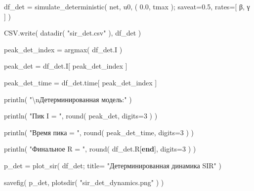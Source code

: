 \documentclass[
  english,
  russian,
  12pt,
  a4paper,
  DIV=11,
  numbers=noendperiod]{scrreprt}
\newenvironment{Shaded}{\begin{snugshade}}{\end{snugshade}}
\newcommand{\FloatTok}[1]{\textcolor[rgb]{0.68,0.00,0.00}{#1}}
\newcommand{\FunctionTok}[1]{\textcolor[rgb]{0.28,0.35,0.67}{#1}}
\newcommand{\KeywordTok}[1]{\textcolor[rgb]{0.00,0.23,0.31}{\textbf{#1}}}
\newcommand{\NormalTok}[1]{\textcolor[rgb]{0.00,0.23,0.31}{#1}}
\newcommand{\OperatorTok}[1]{\textcolor[rgb]{0.37,0.37,0.37}{#1}}
\newcommand{\SpecialCharTok}[1]{\textcolor[rgb]{0.37,0.37,0.37}{#1}}
\newcommand{\StringTok}[1]{\textcolor[rgb]{0.13,0.47,0.30}{#1}}
\begin{document}
\begin{Shaded}
\begin{Highlighting}[]
\NormalTok{df\_det }\OperatorTok{=}
    \FunctionTok{simulate\_deterministic}\NormalTok{(}
\NormalTok{        net,}
\NormalTok{        u0,}
\NormalTok{        (}
            \FloatTok{0.0}\NormalTok{,}
\NormalTok{            tmax}
\NormalTok{        );}
\NormalTok{        saveat}\OperatorTok{=}\FloatTok{0.5}\NormalTok{,}
\NormalTok{        rates}\OperatorTok{=}\NormalTok{[}
\NormalTok{            β,}
\NormalTok{            γ}
\NormalTok{        ]}
\NormalTok{    )}

\NormalTok{CSV.}\FunctionTok{write}\NormalTok{(}
    \FunctionTok{datadir}\NormalTok{(}
        \StringTok{"sir\_det.csv"}
\NormalTok{    ),}
\NormalTok{    df\_det}
\NormalTok{)}

\NormalTok{peak\_det\_index }\OperatorTok{=}
    \FunctionTok{argmax}\NormalTok{(}
\NormalTok{        df\_det.I}
\NormalTok{    )}

\NormalTok{peak\_det }\OperatorTok{=}
\NormalTok{    df\_det.I[}
\NormalTok{        peak\_det\_index}
\NormalTok{    ]}

\NormalTok{peak\_det\_time }\OperatorTok{=}
\NormalTok{    df\_det.time[}
\NormalTok{        peak\_det\_index}
\NormalTok{    ]}

\FunctionTok{println}\NormalTok{(}
    \StringTok{"}\SpecialCharTok{\textbackslash{}n}\StringTok{Детерминированная модель:"}
\NormalTok{)}

\FunctionTok{println}\NormalTok{(}
    \StringTok{"Пик I = "}\NormalTok{,}
    \FunctionTok{round}\NormalTok{(}
\NormalTok{        peak\_det,}
\NormalTok{        digits}\OperatorTok{=}\FloatTok{3}
\NormalTok{    )}
\NormalTok{)}

\FunctionTok{println}\NormalTok{(}
    \StringTok{"Время пика = "}\NormalTok{,}
    \FunctionTok{round}\NormalTok{(}
\NormalTok{        peak\_det\_time,}
\NormalTok{        digits}\OperatorTok{=}\FloatTok{3}
\NormalTok{    )}
\NormalTok{)}

\FunctionTok{println}\NormalTok{(}
    \StringTok{"Финальное R = "}\NormalTok{,}
    \FunctionTok{round}\NormalTok{(}
\NormalTok{        df\_det.R[}\KeywordTok{end}\NormalTok{],}
\NormalTok{        digits}\OperatorTok{=}\FloatTok{3}
\NormalTok{    )}
\NormalTok{)}

\NormalTok{p\_det }\OperatorTok{=}
    \FunctionTok{plot\_sir}\NormalTok{(}
\NormalTok{        df\_det;}
\NormalTok{        title}\OperatorTok{=}
            \StringTok{"Детерминированная динамика SIR"}
\NormalTok{    )}

\FunctionTok{savefig}\NormalTok{(}
\NormalTok{    p\_det,}
    \FunctionTok{plotsdir}\NormalTok{(}
        \StringTok{"sir\_det\_dynamics.png"}
\NormalTok{    )}
\NormalTok{)}
\end{Highlighting}
\end{Shaded}
\end{document}

